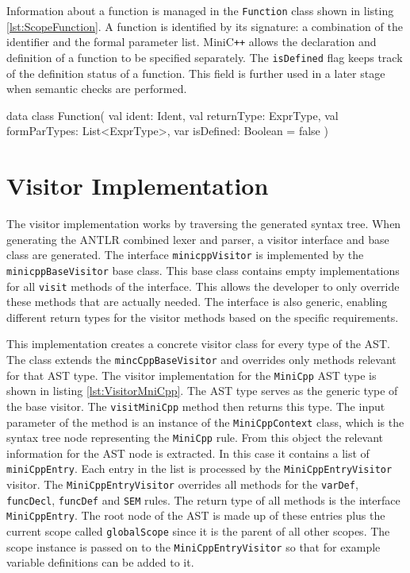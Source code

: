 Information about a function is managed in the \verb|Function| class shown in listing \ref{lst:ScopeFunction}. A function is identified by its signature: a combination of the identifier and the formal parameter list. MiniC\verb|++| allows the declaration and definition of a function to be specified separately. The \verb|isDefined| flag keeps track of the definition status of a function. This field is further used in a later stage when semantic checks are performed.  


\begin{KotlinCode}[float,numbers=none,caption=Implementation of the \texttt{Function} class., label=lst:ScopeFunction]
data class Function(
       val ident: Ident,
       val returnType: ExprType,
       val formParTypes: List<ExprType>,
       var isDefined: Boolean = false
)
\end{KotlinCode}

\section{Visitor Implementation}

The visitor implementation works by traversing the generated syntax tree. When generating the ANTLR combined lexer and parser, a visitor interface and base class are generated. The interface \verb|minicppVisitor| is implemented by the \verb|minicppBaseVisitor| base class. This base class contains empty implementations for all \verb|visit| methods of the interface. This allows the developer to only override these methods that are actually needed. The interface is also generic, enabling different return types for the visitor methods based on the specific requirements. 

This implementation creates a concrete visitor class for every type of the AST. The class extends the \verb|mincCppBaseVisitor| and overrides only methods relevant for that AST type. The visitor implementation for the \verb|MiniCpp| AST type is shown in listing \ref{lst:VisitorMniCpp}. The AST type serves as the generic type of the base visitor. The \verb|visitMiniCpp| method then returns this type. The input parameter of the method is an instance of the \verb|MiniCppContext| class, which is the syntax tree node representing the \verb|MiniCpp| rule. From this object the relevant information for the AST node is extracted. In this case it contains a list of \verb|miniCppEntry|. Each entry in the list is processed by the \verb|MiniCppEntryVisitor| visitor. The \verb|MiniCppEntryVisitor| overrides all methods for the \verb|varDef|, \verb|funcDecl|, \verb|funcDef| and \verb|SEM| rules. The return type of all methods is the interface \verb|MiniCppEntry|. The root node of the AST is made up of these entries plus the current scope called \verb|globalScope| since it is the parent of all other scopes. The scope instance is passed on to the \verb|MiniCppEntryVisitor| so that for example variable definitions can be added to it.

